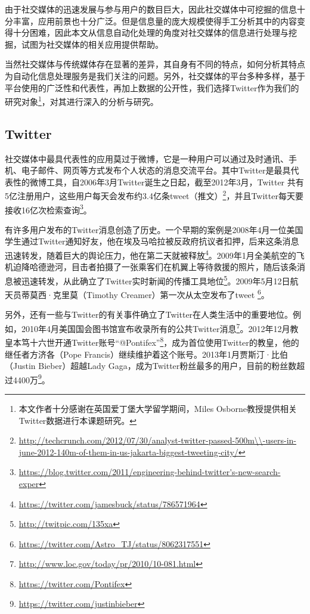 由于社交媒体的迅速发展与参与用户的数目巨大，因此社交媒体中可挖掘的信息十分丰富，应用前景也十分广泛。但是信息量的庞大规模使得手工分析其中的内容变得十分困难，因此本文从信息自动化处理的角度对社交媒体的信息进行处理与挖掘，试图为社交媒体的相关应用提供帮助。

当然社交媒体与传统媒体存在显著的差异，其自身有不同的特点，如何分析其特点为自动化信息处理服务是我们关注的问题。另外，社交媒体的平台多种多样，基于平台使用的广泛性和代表性，再加上数据的公开性，我们选择Twitter作为我们的研究对象\footnote{本文作者十分感谢在英国爱丁堡大学留学期间，Miles Osborne教授提供相关Twitter数据进行本课题研究。}，对其进行深入的分析与研究。

\subsection{Twitter}
社交媒体中最具代表性的应用莫过于微博，它是一种用户可以通过及时通讯、手机、电子邮件、网页等方式发布个人状态的消息交流平台。其中Twitter是最具代表性的微博工具，自2006年3月Twitter诞生之日起，截至2012年3月，Twitter 共有5亿注册用户，这些用户每天会发布约3.4亿条tweet（推文）\footnote{\url{http://techcrunch.com/2012/07/30/analyst-twitter-passed-500m\\-users-in-june-2012-140m-of-them-in-us-jakarta-biggest-tweeting-city/}}，并且Twitter每天要接收16亿次检索查询\footnote{\url{https://blog.twitter.com/2011/engineering-behind-twitter's-new-search-exper}}。

有许多用户发布的Twitter消息创造了历史。一个早期的案例是2008年4月一位美国学生通过Twitter通知好友，他在埃及马哈拉被反政府抗议者扣押，后来这条消息迅速转发，随着巨大的舆论压力，他在第二天就被释放\footnote{\url{https://twitter.com/jamesbuck/status/786571964}}。2009年1月全美航空的飞机迫降哈德逊河，目击者拍摄了一张乘客们在机翼上等待救援的照片，随后该条消息被迅速转发，从此确立了Twitter实时新闻的传播工具地位\footnote{\url{http://twitpic.com/135xa}}。2009年5月12日航天员蒂莫西·克里莫（Timothy Creamer）第一次从太空发布了tweet \footnote{\url{https://twitter.com/Astro_TJ/status/8062317551}}。

另外，还有一些与Twitter的有关事件确立了Twitter在人类生活中的重要地位。例如，2010年4月美国国会图书馆宣布收录所有的公共Twitter消息\footnote{\url{http://www.loc.gov/today/pr/2010/10-081.html}}。2012年12月教皇本笃十六世开通Twitter账号“@Pontifex”\footnote{\url{https://twitter.com/Pontifex}}，成为首位使用Twitter的教皇，他的继任者方济各（Pope Francis）继续维护着这个账号。2013年1月贾斯汀·比伯（Justin Bieber）超越Lady Gaga，成为Twitter粉丝最多的用户，目前的粉丝数超过4400万\footnote{\url{https://twitter.com/justinbieber}}。

